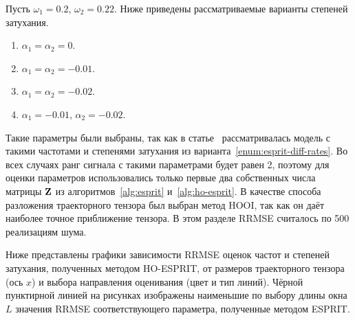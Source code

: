 \documentclass[specialist,
  substylefile=spbu_report.rtx,
subf,href,colorlinks=true, 12pt]{disser}
\theoremstyle{plain}
\theoremstyle{definition}
\theoremstyle{remark}
\begin{document}
Пусть $\omega_1 = 0.2$, $\omega_2 = 0.22$.
Ниже приведены рассматриваемые варианты степеней затухания.
\begin{enumerate}
  \item\label{enum:esprit-no-rates} $\alpha_1=\alpha_2=0$.
  \item\label{enum:esprit-smalleq-rates} $\alpha_1=\alpha_2=-0.01$.
  \item\label{enum:esprit-bigeq-rates} $\alpha_1=\alpha_2=-0.02$.
  \item\label{enum:esprit-diff-rates} $\alpha_1= -0.01$, $\alpha_2=-0.02$.
\end{enumerate}
Такие параметры были выбраны, так как в статье~\cite{hosvd-hooi-separation}
рассматривалась модель с такими частотами и степенями затухания из
варианта~\ref{enum:esprit-diff-rates}.
Во всех случаях ранг сигнала с такими параметрами будет равен 2,
поэтому для оценки параметров
использовались только первые два собственных числа матрицы $\mathbf{Z}$ из
алгоритмов~\ref{alg:esprit}
и~\ref{alg:ho-esprit}.
В качестве способа разложения траекторного тензора был выбран
метод HOOI, так как он даёт наиболее точное приближение
тензора.
В этом разделе RRMSE считалось по 500 реализациям шума.

Ниже представлены графики зависимости RRMSE оценок частот и
степеней затухания,
полученных методом HO-ESPRIT, от размеров траекторного тензора
(ось $x$) и выбора направления оценивания (цвет и тип линий).
Чёрной пунктирной линией на рисунках изображены наименьшие по выбору
длины окна $L$ значения RRMSE
соответствующего параметра, полученные методом ESPRIT.
\end{document}
